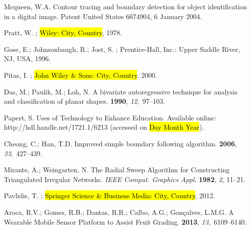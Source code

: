 \documentclass[sensors,article,accept,moreauthors,pdftex,10pt,a4paper]{mdpi}
\begin{document}
\begin{thebibliography}{999} 

Mcqueen, W.A.
\newblock Contour tracing and boundary detection for object identification in a
 digital image.
\newblock Patent United States 6674904, 6 January 2004.

Pratt, W.
; \hl{Wiley: City, Country}, 1978.

Gose, E.; Johnsonbaugh, R.; Jost, S.
; Prentice-Hall, Inc.:
 Upper Saddle River, NJ, USA, 1996.

Pitas, I.
; \hl{John
 Wiley \& Sons: City, Country}, 2000.

Das, M.; Paulik, M.; Loh, N.
\newblock A bivariate autoregressive technique for analysis and classification
 of planar shapes.
 {\bf 1990}, {\em 12},~97--103.

Papert, S.
\newblock Uses of Technology to Enhance Education. Available online: http://hdl.handle.net/1721.1/6213 (accessed on \hl{Day Month Year}).

Cheong, C.; Han, T.D.
\newblock Improved simple boundary following algorithm.
 {\bf 2006}, {\em 33},~427--439.

Mirante, A.; Weingarten, N.
\newblock The Radial Sweep Algorithm for Constructing Triangulated Irregular
 Networks. {\em IEEE Comput. Graphics Appl.} {\bf 1982}, {\em 2}, 11--21.

Pavlidis, T.
; \hl{Springer Science
 \& Business Media: City, Country}, 2012.

Aroca, R.V.; Gomes, R.B.; Dantas, R.R.; Calbo, A.G.; Gonçalves, L.M.G.
\newblock A Wearable Mobile Sensor Platform to Assist Fruit Grading.
 {\bf 2013}, {\em 13},~6109--6140.


\end{thebibliography}
\end{document}
